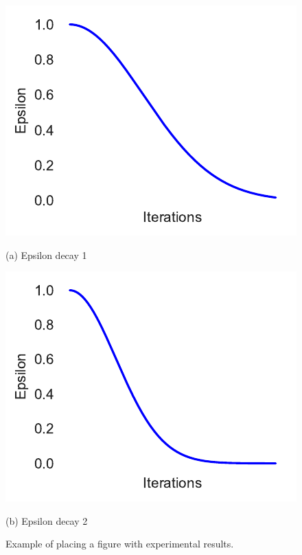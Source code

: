 \begin{figure}[htb]
    \begin{minipage}[b]{.48\linewidth}
        \centering
        \centerline{\includegraphics[width=\linewidth]{pommerman/plots/epsilon_8.pdf}}
        \centerline{(a) Epsilon decay 1}\medskip
    \end{minipage}
    \hfill
    \begin{minipage}[b]{0.48\linewidth}
        \centering
        \centerline{\includegraphics[width=\linewidth]{pommerman/plots/epsilon_20.pdf}}
        \centerline{(b) Epsilon decay 2}\medskip
    \end{minipage}
    \caption{Example of placing a figure with experimental results.}
    \label{fig:res}
\end{figure}


